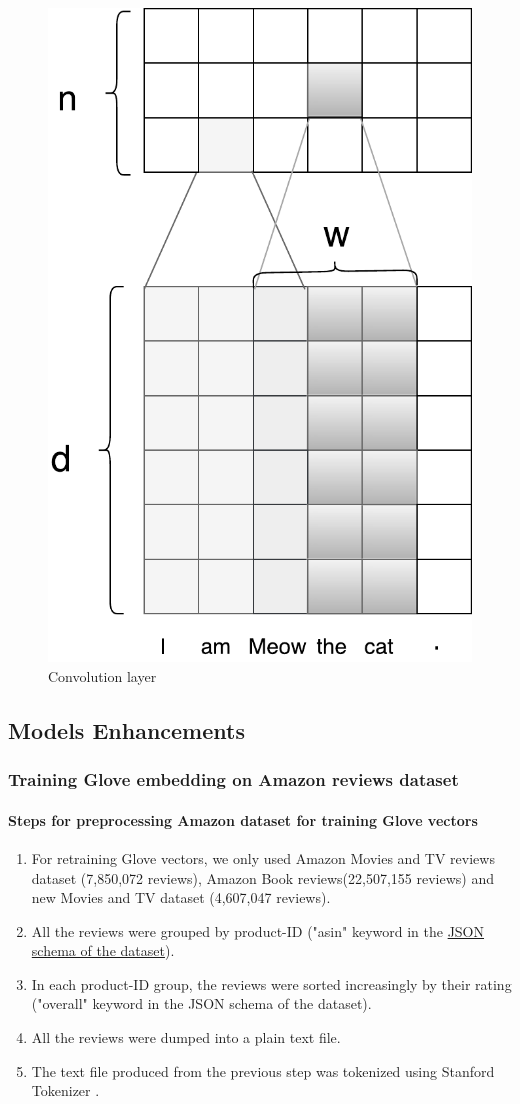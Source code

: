 \begin{figure}[H]
    \centering
    \includegraphics[width=0.4\linewidth]{figure/convlayer}
    \caption[Convolution layer]{Convolution layer}
    \label{fig:convlayer}
\end{figure}

\subsection{Models Enhancements}
\hypertarget{sec:Glove-Amazon}{\subsubsection{Training Glove embedding on Amazon reviews dataset}}
\label{sec:gloveamazone}
\paragraph{Steps for preprocessing Amazon dataset for training Glove vectors}
\label{sec:preprocessamazonglove}
\begin{enumerate}
\item For retraining Glove vectors, we only used Amazon Movies and TV reviews dataset (7,850,072 reviews)\cite{mcauley2013hidden}, Amazon Book reviews(22,507,155 reviews) and new Movies and TV dataset (4,607,047 reviews)\cite{McAuleyTSH15}\cite{HeM16}.
\item All the reviews were grouped by product-ID ("asin" keyword in the \hyperref[sec:amazon]{JSON schema of the dataset}). 
\item In each product-ID group, the reviews were sorted increasingly by their rating ("overall" keyword in the JSON schema of the dataset).
\item All the reviews were dumped into a plain text file.
\item The text file produced from the previous step was tokenized using Stanford Tokenizer \cite{tokenizerpart}. 
\end{enumerate}

